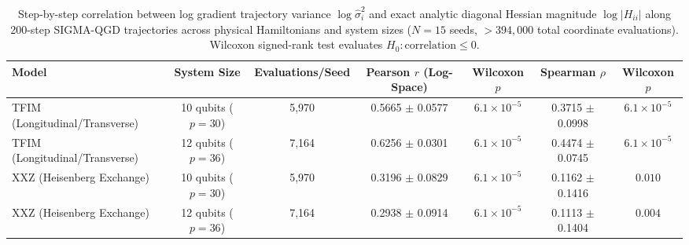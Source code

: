 \begin{table}[htbp]
\centering
\small
\caption{Step-by-step correlation between log gradient trajectory variance $\log \hat{\sigma}_i^2$ and exact analytic diagonal Hessian magnitude $\log |H_{ii}|$ along 200-step SIGMA-QGD trajectories across physical Hamiltonians and system sizes ($N=15$ seeds, $>394{,}000$ total coordinate evaluations). Wilcoxon signed-rank test evaluates $H_0: \text{correlation} \le 0$.}
\label{tab:hessian_corr_consolidated}
\begin{tabular}{lcccccc}
\toprule
\textbf{Model} & \textbf{System Size} & \textbf{Evaluations/Seed} & \textbf{Pearson $r$ (Log-Space)} & \textbf{Wilcoxon $p$} & \textbf{Spearman $\rho$} & \textbf{Wilcoxon $p$} \\
\midrule
TFIM (Longitudinal/Transverse) & 10 qubits ($p=30$) & 5,970 & 0.5665 $\pm$ 0.0577 & $6.1 \times 10^{-5}$ & 0.3715 $\pm$ 0.0998 & $6.1 \times 10^{-5}$ \\
TFIM (Longitudinal/Transverse) & 12 qubits ($p=36$) & 7,164 & 0.6256 $\pm$ 0.0301 & $6.1 \times 10^{-5}$ & 0.4474 $\pm$ 0.0745 & $6.1 \times 10^{-5}$ \\
XXZ (Heisenberg Exchange) & 10 qubits ($p=30$) & 5,970 & 0.3196 $\pm$ 0.0829 & $6.1 \times 10^{-5}$ & 0.1162 $\pm$ 0.1416 & $0.010$ \\
XXZ (Heisenberg Exchange) & 12 qubits ($p=36$) & 7,164 & 0.2938 $\pm$ 0.0914 & $6.1 \times 10^{-5}$ & 0.1113 $\pm$ 0.1404 & $0.004$ \\
\bottomrule
\end{tabular}
\end{table}